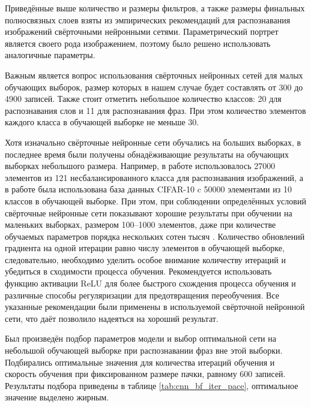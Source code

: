 Приведённые выше количество и размеры фильтров, а также размеры финальных полносвязных слоев взяты из эмпирических рекомендаций для распознавания изображений свёрточными нейронными сетями.
Параметрический портрет является своего рода изображением, поэтому было решено использовать аналогичные параметры.

Важным является вопрос использования свёрточных нейронных сетей для малых обучающих выборок, размер которых в нашем случае будет составлять от 300 до 4900 записей.
Также стоит отметить небольшое количество классов: 20 для распознавания слов и 11 для распознавания фраз.
При этом количество элементов каждого класса в обучающей выборке не меньше 30.

Хотя изначально свёрточные нейронные сети обучались на больших выборках, в последнее время были получены обнадёживающие результаты на обучающих выборках небольшого размера.
Например, в работе \cite{dieleman2015classifying} использовалось 27000 элементов из 121 несбалансированного класса для распознавания изображений, а в работе \cite{truong2018lightweight} была использована база данных CIFAR-10 \cite{cifar10} c 50000 элементами из 10 классов в обучающей выборке.
При этом, при соблюдении определённых условий свёрточные нейронные сети показывают хорошие результаты при обучении на маленьких выборках, размером 100--1000 элементов, даже при количестве обучаемых параметров порядка нескольких сотен тысяч \cite{beam2017cnn}.
Количество обновлений градиента на одной итерации равно числу элементов в обучающей выборке, следовательно, необходимо уделить особое внимание количеству итераций и убедиться в сходимости процесса обучения.
Рекомендуется использовать функцию активации ReLU для более быстрого схождения процесса обучения и различные способы регуляризации для предотвращения переобучения.
Все указанные рекомендации были применены в используемой свёрточной нейронной сети, что даёт позволило надеяться на хороший результат.

Был произведён подбор параметров модели и выбор оптимальной сети на небольшой обучающей выборке при распознавании фраз вне этой выборки.
Подбирались оптимальные значения для количества итераций обучения и скорость обучения при фиксированном размере пачки, равному 600 записей.
Результаты подбора приведены в таблице \ref{tab:cnn_bf_iter_pace}, оптимальное значение выделено жирным.

